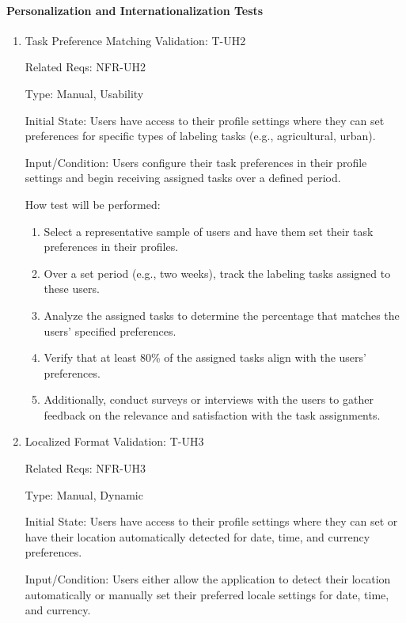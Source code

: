 \documentclass[12pt, titlepage]{article}
\begin{document}
\paragraph{Personalization and Internationalization Tests}
\begin{enumerate}

\item{Task Preference Matching Validation: T-UH2\\}

Related Reqs: NFR-UH2

Type: Manual, Usability

Initial State: Users have access to their profile settings where they can set preferences for specific types of labeling tasks (e.g., agricultural, urban).

Input/Condition: Users configure their task preferences in their profile settings and begin receiving assigned tasks over a defined period.

How test will be performed: 
\begin{enumerate}
    \item Select a representative sample of users and have them set their task preferences in their profiles.
    \item Over a set period (e.g., two weeks), track the labeling tasks assigned to these users.
    \item Analyze the assigned tasks to determine the percentage that matches the users' specified preferences.
    \item Verify that at least 80\% of the assigned tasks align with the users' preferences.
    \item Additionally, conduct surveys or interviews with the users to gather feedback on the relevance and satisfaction with the task assignments.
\end{enumerate}

\item{Localized Format Validation: T-UH3\\}

Related Reqs: NFR-UH3

Type: Manual, Dynamic

Initial State: Users have access to their profile settings where they can set or have their location automatically detected for date, time, and currency preferences.

Input/Condition: Users either allow the application to detect their location automatically or manually set their preferred locale settings for date, time, and currency.


\end{enumerate}
\end{document}
